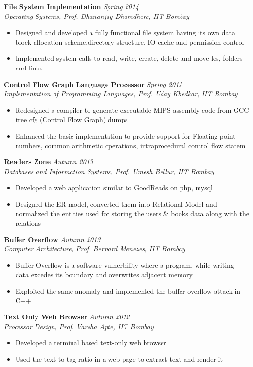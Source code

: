 \documentclass[a4paper,10pt]{article}
\newcommand{\ressubheadingWithGuide}[3]{%

	\textbf{#1} \hfill \textit{#2}\null\\
	\textit{\small #3} %
	\vspace{-4pt}
}
\begin{document}
	\ressubheadingWithGuide{File System Implementation}{Spring 2014}{Operating Systems, Prof. Dhananjay Dhamdhere, IIT Bombay}
		\begin{itemize} \itemsep -1pt
				\item Designed and developed a fully functional file system having its own data block allocation scheme,directory structure, IO cache and permission control
				\item Implemented system calls to read, write, create, delete and move les, folders and links
		\end{itemize}

	\ressubheadingWithGuide{Control Flow Graph Language Processor}{Spring 2014}{Implementation of Programming Languages, Prof. Uday Khedkar, IIT Bombay}
		\begin{itemize} \itemsep -1pt
				\item Redesigned a compiler to generate executable MIPS assembly code from GCC tree cfg (Control Flow Graph) dumps
				\item Enhanced the basic implementation to provide support for Floating point numbers, common arithmetic operations, intraprocedural control flow statem
		\end{itemize}

	\ressubheadingWithGuide{Readers Zone}{Autumn 2013}{Databases and Information Systems, Prof. Umesh Bellur, IIT Bombay}
	    \begin{itemize} \itemsep -1pt
			\item Developed a web application similar to GoodReads on php, mysql
			\item Designed the ER model, converted them into Relational Model and normalized the entities used for storing the users \& books data along with the relations
		\end{itemize}

	\ressubheadingWithGuide{Buffer Overflow}{Autumn 2013}{Computer Architecture, Prof. Bernard Menezes, IIT Bombay}
		\begin{itemize}\itemsep -1pt
	    	\item Buffer Overflow is a software vulnerbility where a program, while writing data excedes its boundary and overwrites adjacent memory
			\item Exploited the same anomaly and implemented the buffer overflow attack in C++
		\end{itemize}


	\ressubheadingWithGuide{Text Only Web Browser}{Autumn 2012}{Processor Design, Prof. Varsha Apte, IIT Bombay}
    	\begin{itemize}\itemsep -1pt
	    	\item Developed a terminal based text-only web browser
			\item Used the text to tag ratio in a web-page to extract text and render it
		\end{itemize}
\end{document}
